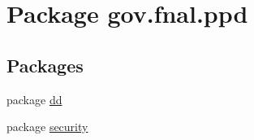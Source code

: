 \hypertarget{namespacegov_1_1fnal_1_1ppd}{\section{Package gov.\-fnal.\-ppd}
\label{namespacegov_1_1fnal_1_1ppd}
}
\subsection*{Packages}
\begin{DoxyCompactItemize}
\item 
package \hyperlink{namespacegov_1_1fnal_1_1ppd_1_1dd}{dd}
\item 
package \hyperlink{namespacegov_1_1fnal_1_1ppd_1_1security}{security}
\end{DoxyCompactItemize}
